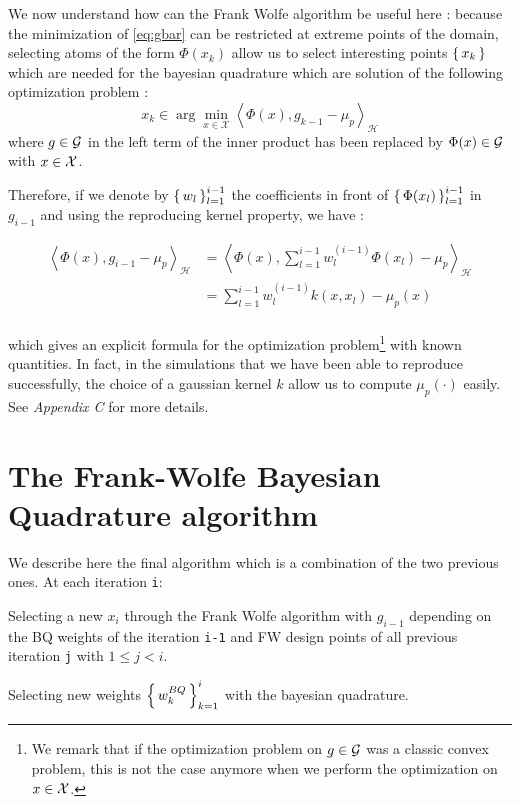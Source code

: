  We now understand how can the Frank Wolfe algorithm be useful here : because the
 minimization of \eqref{eq:gbar} can be restricted at extreme points of the domain,
 selecting atoms of the form $\Phi(x_k)$ allow us to select interesting points $\left \{ \, x_k \, \right \}$ which are needed for the bayesian quadrature which are solution of the
 following optimization problem :
 \begin{equation}
   x_k \in \arg \min _ { x \in \mathcal { X } } \left\langle \Phi ( x ) , g _ { k - 1 } - \mu _ { p } \right\rangle _ { \mathcal { H } }
 \end{equation}
 where $g \in \mathcal{G}$ in the left term of the inner product has been replaced by $\Phi(x) \in \mathcal{G}$ with $x \in \mathcal{X}$.

 Therefore, if we denote by $\left \{ \, w_l \, \right \}_{l=1}^{i-1}$ the coefficients in front of
 $\left \{ \, \Phi(x_l) \, \right \}_{l=1}^{i-1}$ in $g_{i-1}$ and using the reproducing kernel property, we have :
 \begin{boxcomputation}
   \begin{align*}
     \left\langle \Phi ( x ) , g _ { i - 1 } - \mu _ { p } \right\rangle _ { \mathcal { H } } &= \left\langle \Phi ( x ) , \sum _ { l = 1 } ^ { i - 1 } w _ { l } ^ { ( i - 1 ) } \Phi \left( x _ { l } \right) - \mu _ { p } \right\rangle _ { \mathcal { H } }\\
     &= \sum _ { l = 1 } ^ { i - 1 } w _ { l } ^ { ( i - 1 ) } k \left( x , x _ { l } \right) - \mu _ { p } ( x )\\
   \end{align*}
 \end{boxcomputation}
which gives an explicit formula for the optimization problem\footnote{We remark that if
 the optimization problem on $g \in \mathcal{G}$ was a classic convex problem, this is not the case anymore when we perform the optimization on $x \in \mathcal{X}$.} with known quantities.
 In fact, in the simulations that we have been able to reproduce successfully, the choice of a gaussian kernel $k$ allow us to compute $\mu_p( \cdot )$ easily. See \cite{FWBQ} \textit{Appendix C} for more details.
 \section{The Frank-Wolfe Bayesian Quadrature algorithm}
 \label{sec:CC}

We describe here the final algorithm which is a combination of the two previous
 ones.
    At each iteration \texttt{i}:
 \begin{mydescription}
   \item [Selecting a new $x_i$] through the Frank Wolfe algorithm with $g_{i-1}$ depending
   on the BQ weights of the iteration \texttt{i-1} and FW design points of all previous iteration \texttt{j} with $1 \leq j<i$.
   \item [Selecting new weights $\left \{ \, w_k^{BQ} \, \right \}_{k=1}^i$] with the bayesian quadrature.
 \end{mydescription}

